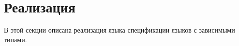 \section{Реализация}
В этой секции описана реализация языка спецификации языков с зависимыми типами.













